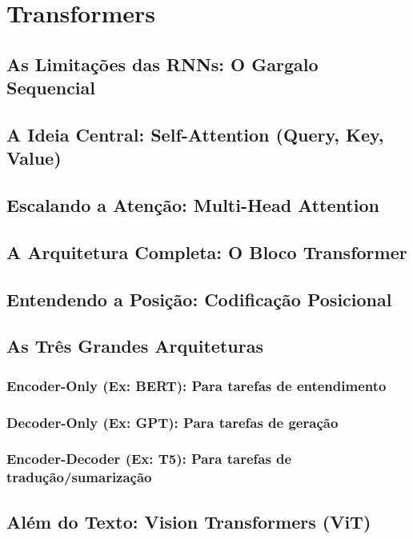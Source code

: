 
\chapter{Transformers}
\label{cap:transformers}

\section{As Limitações das RNNs: O Gargalo Sequencial}

\section{A Ideia Central: Self-Attention (Query, Key, Value)}

\section{Escalando a Atenção: Multi-Head Attention}

\section{A Arquitetura Completa: O Bloco Transformer}

\section{Entendendo a Posição: Codificação Posicional}

\section{As Três Grandes Arquiteturas}

\subsection{Encoder-Only (Ex: BERT): Para tarefas de entendimento}

\subsection{Decoder-Only (Ex: GPT): Para tarefas de geração}

\subsection{Encoder-Decoder (Ex: T5): Para tarefas de tradução/sumarização}

\section{Além do Texto: Vision Transformers (ViT)}